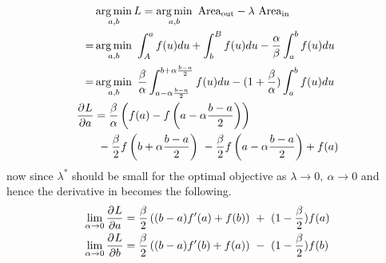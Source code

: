 \begin{equation}
\begin{aligned} 
&\operatorname*{arg\,min}_{a,b} L = \operatorname*{arg\,min}_{a,b}~ \text{Area}_{\text{out}} - \lambda ~ \text{Area}_{\text{in}} \\
=& \operatorname*{arg\,min}_{a,b}~ \int_{A}^{a}f(u)du + \int_{b}^{B}f(u)du - \frac{\alpha}{\beta} \int_{a}^{b}f(u)du \\
=& \operatorname*{arg\,min}_{a,b}~ \frac{\beta}{\alpha} \int_{a - \alpha \frac{b-a}{2}}^{b + \alpha \frac{b-a}{2} }f(u)du  - (1+\frac{\beta}{\alpha})\int_{a}^{b}f(u)du \\
\frac{\partial^{} L}{\partial a} &= \frac{\beta}{\alpha}\left(f(a) - f\left(a - \alpha \frac{b-a}{2}\right) \right) \\&~- \frac{\beta}{2}f\left(b + \alpha \frac{b-a}{2}\right) ~ - \frac{\beta}{2}f\left(a - \alpha \frac{b-a}{2}\right) + f(a) 
\label{eq:loss-oir2}
\end{aligned}
\end{equation}
now since $\lambda^{*}$ should be small for the optimal objective as $\lambda \rightarrow 0 ,~ \alpha \rightarrow 0$ and hence the derivative in \eqLabel{\ref{eq:loss-oir2}} becomes the following.  
\begin{equation}
\begin{aligned} 
\lim_{\alpha \to 0}\frac{\partial^{} L}{\partial a} &= \frac{\beta}{2}\left((b-a)f^{\prime}(a) + f(b)\right) ~+~ (1-\frac{\beta}{2})f(a) \\
\lim_{\alpha \to 0}\frac{\partial^{} L}{\partial b} &= \frac{\beta}{2}\left((b-a)f^{\prime}(b) + f(a)\right) ~-~ (1-\frac{\beta}{2})f(b) 
\label{eq:update-oir-3}
\end{aligned}
\end{equation}
